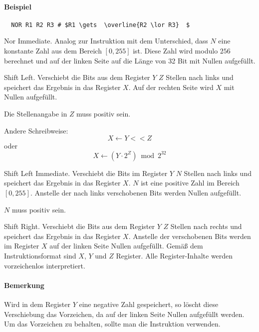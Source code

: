 \paragraph{Beispiel}
\begin{lstlisting}
  NOR R1 R2 R3 # $R1 \gets  \overline{R2 \lor R3}  $
\end{lstlisting}


\glqq Nor Immediate\grqq.
Analog zur Instruktion  mit dem Unterschied, dass $N$ eine konstante
Zahl aus dem Bereich $[0, 255]$ ist. Diese Zahl wird modulo $256$ berechnet und
auf der linken Seite auf die Länge von 32 Bit mit Nullen aufgefüllt.



\glqq Shift Left\grqq.
Verschiebt die Bits aus dem Register $Y$ $Z$ Stellen nach links und speichert
das Ergebnis in das Register $X$.
Auf der rechten Seite wird $X$ mit Nullen aufgefüllt.

Die Stellenangabe in $Z$ muss positiv sein.

Andere Schreibweise:
\[
    X \gets Y << Z
\]
oder 
\[
    X \gets 
    ( Y \cdot 2^{Z}  ) \bmod 2^{32}
\]



\glqq Shift Left Immediate\grqq.
Verschiebt die Bits im Register $Y$ $N$ Stellen nach links und speichert das
Ergebnis in das Register $X$.
$N$ ist eine positive Zahl im Bereich $[0, 255]$.
Anstelle der nach links verschobenen Bits werden Nullen aufgefüllt.

$N$ muss positiv sein.



\glqq Shift Right\grqq.
Verschiebt die Bits aus dem Register $Y$ $Z$ Stellen nach rechts und speichert
das Ergebnis in das Register $X$. 
Anstelle der verschobenen Bits werden im Register $X$ auf der linken Seite
Nullen aufgefüllt.
Gemäß dem Instruktionsformat  sind $X$, $Y$ und $Z$ Register.
Alle Register-Inhalte werden vorzeichenlos interpretiert.

\paragraph{Bemerkung}
Wird in dem Register $Y$ eine negative Zahl gespeichert, so löscht diese
Verschiebung das Vorzeichen, da auf der linken Seite Nullen aufgefüllt werden.
Um das Vorzeichen zu behalten, sollte man die Instruktion 
verwenden.

